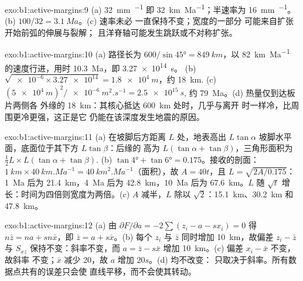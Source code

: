 \begin{solution}{exo:b1:active-margins:9}
(a) \qty{32}{mm.^{-1}} 即 \qty{32}{km.Ma^{-1}}；半速率为
\qty{16}{mm.^{-1}}。(b) $100/32 = \qty{3.1}{Ma}$。(c) 速率未必
一直保持不变；宽度的一部分
可能来自扩张开始前弧的伸展与裂解；
且洋脊轴可能发生跳跃或不对称扩张。
\end{solution}

\begin{solution}{exo:b1:active-margins:10}
(a) 路径长为 $600/\sin\ang{45} = \qty{849}{km}$，以
\qty{82}{km.Ma^{-1}} 的速度行进，用时 \qty{10.3}{Ma}，即 \qty{3.27e14}{s}。
(b) $\sqrt{\num{e-6}\times\num{3.27e14}} = \qty{1.8e4}{m}$，约
\qty{18}{km}. (c) $(\qty{5e4}{m})^2/\qty{e-6}{m^2.s^{-1}} = \qty{2.5e15}{s}$,
约 \qty{79}{Ma}。(d) 热量仅到达板片两侧各
外缘的 \qty{18}{km}：其核心抵达 \qty{600}{km} 处时，几乎与离开
时一样冷，比周围更冷更强，这正是它
仍能在该深度发生地震的原因。
\end{solution}

\begin{solution}{exo:b1:active-margins:11}
(a) 在坡脚后方距离 $L$ 处，地表高出 $L\tan\alpha$
坡脚水平面，底面位于其下方 $L\tan\beta$：后缘的
高为 $L(\tan\alpha + \tan\beta)$，三角形面积为
$\frac12 L\times L(\tan\alpha + \tan\beta)$. (b) $\tan\ang{4} + \tan\ang{6} =
0.175$。接收的剖面：$\qty{1}{km}\times\qty{40}{km.Ma^{-1}} =
\qty{40}{km^2.Ma^{-1}}$（面积），故 $A = 40t$，且
$L = \sqrt{2A/0.175}$：\qty{1}{Ma} 后为 \qty{21.4}{km}，\qty{4}{Ma} 后为
\qty{42.8}{km}，\qty{10}{Ma} 后为 \qty{67.6}{km}。$L$ 随
$\sqrt t$ 增长：时间为四倍则宽度为两倍。(c) $A$ 减半，$L$
除以 $\sqrt2$：\qty{15.1}{km}、\qty{30.2}{km} 和 \qty{47.8}{km}。
\end{solution}

\begin{solution}{exo:b1:active-margins:12}
(a) 由 $\partial F/\partial a = -2\sum(z_i - a - s x_i) = 0$ 得
$n\bar z = na + sn\bar x$，即 $\bar z = a + s\bar x$。(b) 每个 $z_i$ 与
$\bar z$ 同时增加 \qty{10}{km}，故偏差 $z_i - \bar z$ 与 $S_{xz}$
保持不变：斜率不变，而 $a = \bar z - s\bar x$ 增加
\qty{10}{km}。(c) 偏差 $x_i - \bar x$ 不变，故斜率
不变；$\bar x$ 减少 20，故 $a$ 增加 $20s$。(d) 均不改变：
只取决于斜率。所有数据点共有的误差只会使
直线平移，而不会使其转动。
\end{solution}

